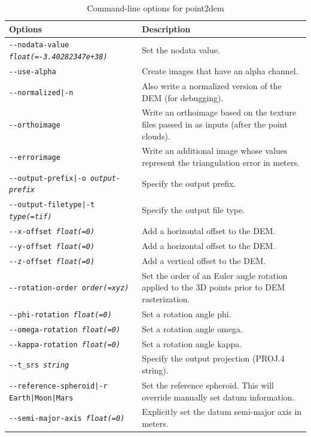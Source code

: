 \begin{longtable}{|p{8cm}|p{9cm}|}
\caption{Command-line options for point2dem}
\label{tbl:point2dem}
\endfirsthead
\endhead
\endfoot
\endlastfoot
\hline
Options & Description \\ \hline \hline
\texttt{-\/-nodata-value \textit{float(=-3.40282347e+38)}} & Set the nodata value. \\ \hline
\texttt{-\/-use-alpha} & Create images that have an alpha channel. \\ \hline
\texttt{-\/-normalized|-n} & Also write a normalized version of the \ac{DEM} (for debugging). \\ \hline
\texttt{-\/-orthoimage} & Write an orthoimage based on the texture files passed in as inputs (after the point clouds). \\ \hline
\texttt{-\/-errorimage} & Write an additional image whose values represent the triangulation error in meters. \\ \hline
\texttt{-\/-output-prefix|-o \textit{output-prefix}} & Specify the output prefix. \\ \hline
\texttt{-\/-output-filetype|-t \textit{type(=tif)}} & Specify the output file type. \\ \hline
\hline
\texttt{-\/-x-offset \textit{float(=0)}} & Add a horizontal offset to the \ac{DEM}. \\ \hline
\texttt{-\/-y-offset \textit{float(=0)}} & Add a horizontal offset to the \ac{DEM}. \\ \hline
\texttt{-\/-z-offset \textit{float(=0)}} & Add a vertical offset to the \ac{DEM}. \\ \hline
\texttt{-\/-rotation-order \textit{order(=xyz)}} & Set the order of an Euler angle rotation applied to the 3D points prior to \ac{DEM} rasterization. \\ \hline
\texttt{-\/-phi-rotation \textit{float(=0)}} & Set a rotation angle phi. \\ \hline
\texttt{-\/-omega-rotation \textit{float(=0)}} & Set a rotation angle omega. \\ \hline
\texttt{-\/-kappa-rotation \textit{float(=0)}} & Set a rotation angle kappa. \\ \hline
\hline
\texttt{-\/-t\_srs \textit{string}} & Specify the output projection (PROJ.4 string). \\ \hline
\texttt{-\/-reference-spheroid|-r Earth|Moon|Mars} & Set the reference spheroid. This will override manually set datum information. \\ \hline
\texttt{-\/-semi-major-axis \textit{float(=0)}} & Explicitly set the datum semi-major axis in meters.\\ \hline

\end{longtable}
